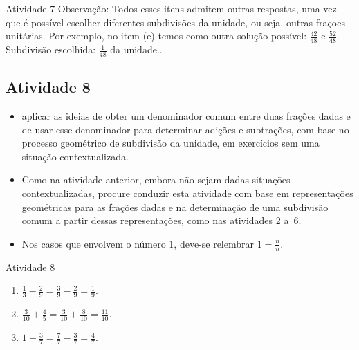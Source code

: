 \begin{multicols}{2}
\begin{resposta*}{Atividade 7}
  Observação: Todos esses itens admitem outras respostas, uma vez que é possível escolher diferentes subdivisões da unidade, ou seja, outras fraçoes unitárias. Por exemplo, no item (e) temos como outra solução possível:   $\frac{42}{48}$   e   $\frac{52}{48}$. Subdivisão escolhida:   $\frac{1}{48}$   da unidade..
\end{resposta*}



\subsection{Atividade 8}

  \newline \vspace{.15cm}

  \begin{itemize} %
    \item       aplicar as ideias de obter um denominador comum entre duas frações dadas e de usar esse denominador para determinar adições e subtrações, com base no processo geométrico de subdivisão da unidade, em exercícios sem uma situação contextualizada.
  \end{itemize} %


   \vspace{.15cm}

  \begin{itemize} %
    \item       Como na atividade anterior, embora não sejam dadas situações contextualizadas, procure conduzir esta atividade com base em representações geométricas para as frações dadas e na determinação de uma subdivisão comum a partir dessas representações, como nas atividades 2 a~6.
    \item  Nos casos que envolvem o número 1, deve-se relembrar   $1 = \frac{n}{n}$.
  \end{itemize} %

\begin{resposta*}{Atividade 8}

\begin{enumerate} [\quad a)] %
    \item             $\frac{1}{3} - \frac{2}{9} = \frac{3}{9} - \frac{2}{9} = \frac{1}{9}$.
    \item             $\frac{3}{10}+\frac{4}{5} = \frac{3}{10}+\frac{8}{10} =\frac{11}{10}$.
    \item             $1 - \frac{3}{7} = \frac{7}{7} - \frac{3}{7} = \frac{4}{7}$.
\end{enumerate} %



\end{resposta*}
\end{multicols}
